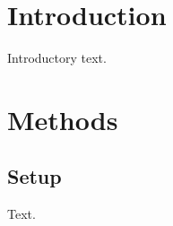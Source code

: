 \documentclass{report}
\begin{document}
\tableofcontents
\chapter*{Introduction}
Introductory text.
\chapter{Methods}
\section*{Setup}
Text.
\end{document}
